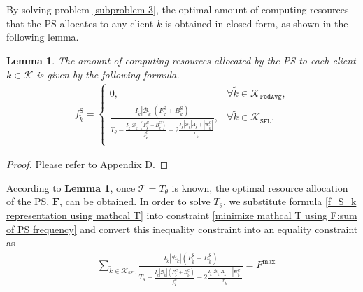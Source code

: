 \documentclass[10pt,journal,transmag]{IEEEtran}
\newtheorem{lemma}{Lemma}
\begin{document}
By solving problem \eqref{subproblem 3}, the optimal amount of computing resources that the PS allocates to any client $k$ is obtained in closed-form, as shown in the following lemma.
\begin{lemma}
    The amount of computing resources allocated by the PS to each client $\tilde{k}\in\mathcal{K}$ is given by the following formula.
    \begin{align}
        f^\text{S}_{\tilde{k}} = 
        \begin{cases} 
            0, & \forall \tilde{k} \in \mathcal{K}_{\texttt{FedAvg}}, \\ 
            \frac{I_{\tilde{k}} \left|\mathcal{B}_{\tilde{k}}\right| (F^\text{S}_{\tilde{k}} + B^\text{S}_{\tilde{k}}) }{ T_\theta - \frac{ I_{\tilde{k}} \left|\mathcal{B}_{\tilde{k}}\right| (F^\text{C}_{\tilde{k}} + B^\text{C}_{\tilde{k}}) }{ f^\text{C}_{\tilde{k}} } - 2 \frac{I_{\tilde{k}} \left|\mathcal{B}_{\tilde{k}}\right| \Lambda_{\tilde{k}} + |\textbf{w}^\text{C}_{\tilde{k}}|}{r_{{\tilde{k}}}} } , & \forall \tilde{k} \in \mathcal{K}_{\texttt{SFL}}. \\ 
        \end{cases} \label{f_S_k representation using mathcal T}
    \end{align} 
    \label{optimal solution}
\end{lemma}

\begin{proof}
    Please refer to Appendix D.
\end{proof}

According to \textbf{Lemma \ref{optimal solution}}, once $\mathcal{T}=T_\theta$ is known, the optimal resource allocation of the PS, $\textbf{F}$, can be obtained. In order to solve $T_\theta$, we substitute formula \eqref{f_S_k representation using mathcal T} into constraint \eqref{minimize mathcal T using F:sum of PS frequency} and convert this inequality constraint into an equality constraint as  
\begin{align}
    & \sum_{\tilde{k} \in \mathcal{K}_{\texttt{SFL}} } \frac{I_{\tilde{k}} \left|\mathcal{B}_{\tilde{k}}\right| (F^\text{S}_{\tilde{k}} + B^\text{S}_{\tilde{k}}) }{ T_\theta - \frac{ I_{\tilde{k}} \left|\mathcal{B}_{\tilde{k}}\right| (F^\text{C}_{\tilde{k}} + B^\text{C}_{\tilde{k}}) }{ f^\text{C}_{\tilde{k}} } - 2 \frac{I_{\tilde{k}} \left|\mathcal{B}_{\tilde{k}}\right| \Lambda_{\tilde{k}} + |\textbf{w}^\text{C}_{\tilde{k}}|}{r_{\tilde{k}}} } = F^\text{max}
    \label{solve t_theta}
\end{align}
\end{document}
